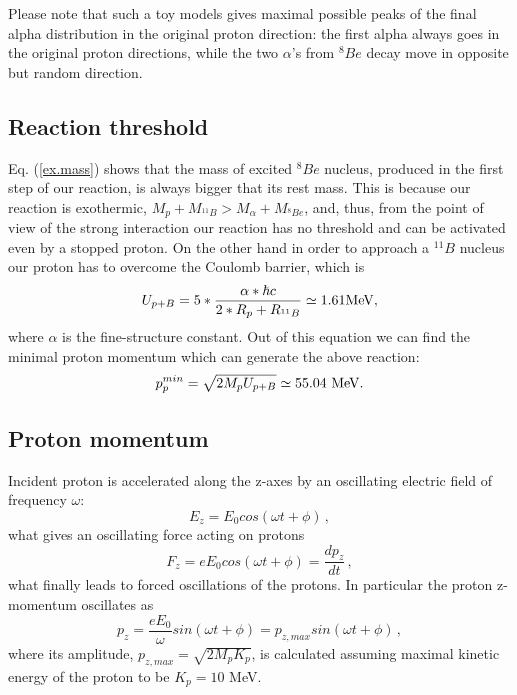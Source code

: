 \documentclass[aps,prc,twocolumn,floatfix,showpacs,a4paper,
nofootinbib,amsmath,amssymb]{revtex4}
\newcommand{\be}{\begin{equation}}
\newcommand{\ee}{\end{equation}}
\begin{document}
Please note that such a toy models gives maximal possible peaks of the final alpha distribution in the original proton direction: the first alpha always goes in the original proton directions, while the two $\alpha$'s from $^8Be$ decay move in opposite but random direction.

\subsection{Reaction threshold}
Eq. (\ref{ex.mass}) shows that the mass of excited $^8Be$ nucleus, produced in the first step of our reaction, is always bigger that its rest mass. This is because our reaction is exothermic,  $M_p + M_{^{11}B} > M_{\alpha}+M_{^8Be}$, and, thus, from the point of view of the strong interaction our reaction has no threshold and can be activated even by a stopped proton. On the other hand in order to approach a $^{11}B$ nucleus our proton has to overcome the Coulomb barrier, which is 
\begin{equation}
	U_{p+B}=5*\frac{\alpha*\hbar c}{2*R_p+R_{^{11}B}}\simeq 1.61 {\rm MeV},
\end{equation}
where $\alpha$ is the fine-structure constant. Out of this equation we can find the minimal proton momentum which can generate the above reaction: 
\be
p_p^{min}=\sqrt{2 M_p U_{p+B}}\simeq 55.04\ {\rm MeV}.
\label{threshold1}
\ee

\subsection{Proton momentum }
Incident proton is accelerated along the z-axes by an oscillating electric field of frequency $\omega$:
\begin{equation}
E_z = E_0cos(\omega t + \phi)\,,
\end{equation}
what gives an oscillating force acting on protons
\begin{equation}
F_z = e E_0cos(\omega t + \phi) = \frac{dp_z}{dt}\,,
\end{equation}
what finally leads to forced oscillations of the protons. In particular the proton z-momentum oscillates as
\begin{equation}
p_z = \frac{eE_0}{\omega} sin(\omega t + \phi) = p_{z,max} sin(\omega t + \phi)\,,
\label{oscl}
\end{equation}
where its amplitude, $p_{z,max} = \sqrt{2M_pK_p}$, is calculated assuming maximal kinetic energy of  the proton to be $K_p=10$ MeV.   
\end{document}
